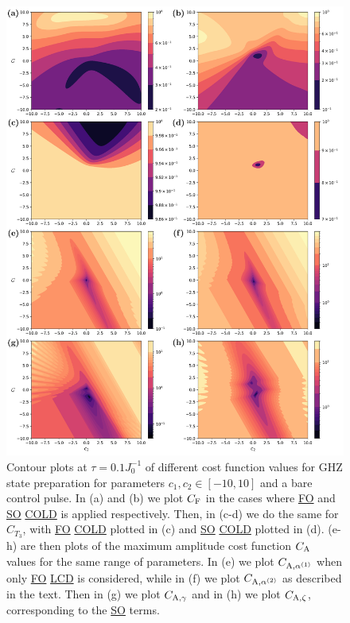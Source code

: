 \documentclass[a4paper,oneside,11pt]{book}
\newcommand{\acrref}[1]{\hyperref[acr:#1]{#1}}
\begin{document}
\begin{figure}[t!]
    \centering
    \includegraphics[width=0.8\linewidth]{images/final_plot_max_nogrape.png} \caption[Contour plots of cost function landscapes for GHZ state preparation in frustrated spin systems (maximum amplitude cost function) using a bare optimisation pulse.]{Contour plots at $\tau = 0.1 J_0^{-1}$ of different cost function values for GHZ state preparation for parameters $c_1, c_2 \in [-10,10]$ and a bare control pulse. In (a) and (b) we plot $C_{\rm F}$ in the cases where \acrref{FO} and \acrref{SO} \acrref{COLD} is applied respectively. Then, in (c-d) we do the same for $C_{T_3}$, with \acrref{FO} \acrref{COLD} plotted in (c) and \acrref{SO} \acrref{COLD} plotted in (d). (e-h) are then plots of the maximum amplitude cost function $C_{\rm A}$ values for the same range of parameters. In (e) we plot $C_{\rm A, \alpha^{(1)}}$ when only \acrref{FO} \acrref{LCD} is considered, while in (f) we plot $C_{\rm A, \alpha^{(2)}}$ as described in the text. Then in (g) we plot $C_{\rm A, \gamma}$ and in (h) we plot $C_{\rm A, \zeta}$, corresponding to the \acrref{SO} terms.}\label{fig:ghz_contours_max_noGRAPE}
\end{figure}
\end{document}
